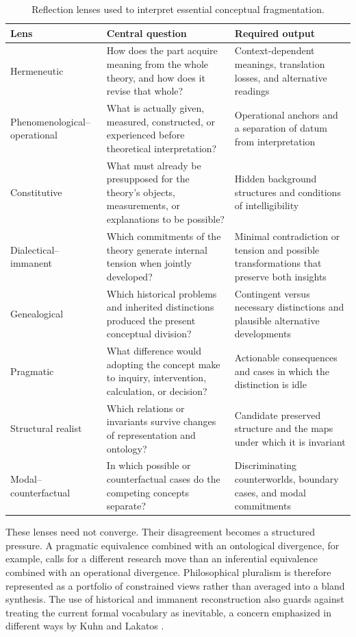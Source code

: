\documentclass[11pt]{article}
\begin{document}
\begin{table}[ht]
\centering
\small
\begin{tabularx}{\textwidth}{
>{\raggedright\arraybackslash}p{}
>{\raggedright\arraybackslash}p{}X}
\toprule
Lens & Central question & Required output \\
\midrule
Hermeneutic & How does the part acquire meaning from the whole theory, and how does it revise that whole? & Context-dependent meanings, translation losses, and alternative readings \\
Phenomenological--operational & What is actually given, measured, constructed, or experienced before theoretical interpretation? & Operational anchors and a separation of datum from interpretation \\
Constitutive & What must already be presupposed for the theory's objects, measurements, or explanations to be possible? & Hidden background structures and conditions of intelligibility \\
Dialectical--immanent & Which commitments of the theory generate internal tension when jointly developed? & Minimal contradiction or tension and possible transformations that preserve both insights \\
Genealogical & Which historical problems and inherited distinctions produced the present conceptual division? & Contingent versus necessary distinctions and plausible alternative developments \\
Pragmatic & What difference would adopting the concept make to inquiry, intervention, calculation, or decision? & Actionable consequences and cases in which the distinction is idle \\
Structural realist & Which relations or invariants survive changes of representation and ontology? & Candidate preserved structure and the maps under which it is invariant \\
Modal--counterfactual & In which possible or counterfactual cases do the competing concepts separate? & Discriminating counterworlds, boundary cases, and modal commitments \\
\bottomrule
\end{tabularx}
\caption{Reflection lenses used to interpret essential conceptual fragmentation.}
\label{tab:reflection-lenses}
\end{table}

These lenses need not converge. Their disagreement becomes a structured pressure. A pragmatic
equivalence combined with an ontological divergence, for example, calls for a different research move
than an inferential equivalence combined with an operational divergence. Philosophical pluralism is
therefore represented as a portfolio of constrained views rather than averaged into a bland synthesis.
The use of historical and immanent reconstruction also guards against treating the current formal
vocabulary as inevitable, a concern emphasized in different ways by Kuhn and Lakatos
\cite{kuhn1962,lakatos1976}.
\end{document}
